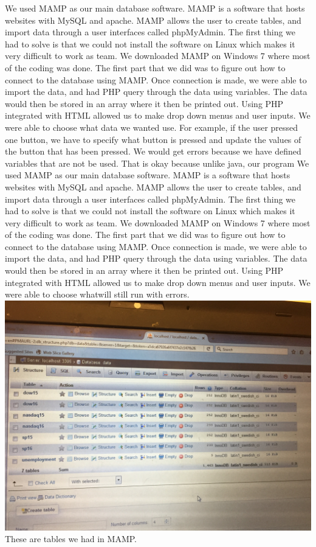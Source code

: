 \documentclass[12pt]{report}
\begin{document}
We used MAMP as our main database software. MAMP is a software that hosts websites with MySQL and apache. MAMP allows the user to create tables, and import data through a user interfaces called phpMyAdmin. The first thing we had to solve is that we could not install the software on Linux which makes it very difficult to work as team. We downloaded MAMP on Windows 7 where most of the coding was done. The first part that we did was to figure out how to connect to the database using MAMP. Once connection is made, we were able to import the data, and had PHP query through the data using variables. The data would then be stored in an array where it then be printed out. Using PHP integrated with HTML allowed us to make drop down menus and user inputs. We were able to choose what data we wanted use. For example, if the user pressed one button, we have to specify what button is pressed and update the values of the button that has been pressed. We would get errors because we have defined variables that are not be used. That is okay because unlike java, our program We used MAMP as our main database software. MAMP is a software that hosts websites with MySQL and apache. MAMP allows the user to create tables, and import data through a user interfaces called phpMyAdmin. The first thing we had to solve is that we could not install the software on Linux which makes it very difficult to work as team. We downloaded MAMP on Windows 7 where most of the coding was done. The first part that we did was to figure out how to connect to the database using MAMP. Once connection is made, we were able to import the data, and had PHP query through the data using variables. The data would then be stored in an array where it then be printed out. Using PHP integrated with HTML allowed us to make drop down menus and user inputs. We were able to choose whatwill still run with errors.\\
\includegraphics[scale=.13]{table.png}
\\These are tables we had in MAMP.\\
\end{document}
